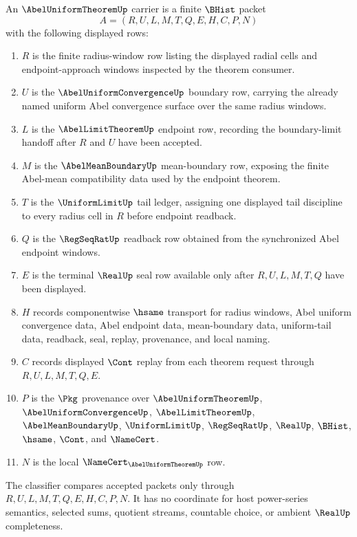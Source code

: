 \begin{definition}
\label{def:abel-uniform-theorem-carrier}
An $\AbelUniformTheoremUp$ carrier is a finite $\BHist$ packet
$$
A=(R,U,L,M,T,Q,E,H,C,P,N)
$$
with the following displayed rows:
\begin{enumerate}
\item $R$ is the finite radius-window row listing the displayed radial cells and endpoint-approach windows inspected by the theorem consumer.
\item $U$ is the $\AbelUniformConvergenceUp$ boundary row, carrying the already named uniform Abel convergence surface over the same radius windows.
\item $L$ is the $\AbelLimitTheoremUp$ endpoint row, recording the boundary-limit handoff after $R$ and $U$ have been accepted.
\item $M$ is the $\AbelMeanBoundaryUp$ mean-boundary row, exposing the finite Abel-mean compatibility data used by the endpoint theorem.
\item $T$ is the $\UniformLimitUp$ tail ledger, assigning one displayed tail discipline to every radius cell in $R$ before endpoint readback.
\item $Q$ is the $\RegSeqRatUp$ readback row obtained from the synchronized Abel endpoint windows.
\item $E$ is the terminal $\RealUp$ seal row available only after $R,U,L,M,T,Q$ have been displayed.
\item $H$ records componentwise $\hsame$ transport for radius windows, Abel uniform convergence data, Abel endpoint data, mean-boundary data, uniform-tail data, readback, seal, replay, provenance, and local naming.
\item $C$ records displayed $\Cont$ replay from each theorem request through $R,U,L,M,T,Q,E$.
\item $P$ is the $\Pkg$ provenance over $\AbelUniformTheoremUp$, $\AbelUniformConvergenceUp$, $\AbelLimitTheoremUp$, $\AbelMeanBoundaryUp$, $\UniformLimitUp$, $\RegSeqRatUp$, $\RealUp$, $\BHist$, $\hsame$, $\Cont$, and $\NameCert$.
\item $N$ is the local $\NameCert_{\AbelUniformTheoremUp}$ row.
\end{enumerate}
The classifier compares accepted packets only through $R,U,L,M,T,Q,E,H,C,P,N$. It has no coordinate for host power-series semantics, selected sums, quotient streams, countable choice, or ambient $\RealUp$ completeness.
\end{definition}

